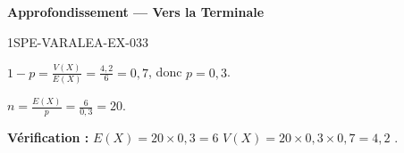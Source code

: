 \begin{center}\textbf{Approfondissement — Vers la Terminale}\end{center}
\begin{corrige}{1SPE-VARALEA-EX-033}


$1-p = \frac{V(X)}{E(X)} = \frac{4{,}2}{6} = 0{,}7$, donc $p = 0{,}3$.

$n = \frac{E(X)}{p} = \frac{6}{0{,}3} = 20$.

\textbf{Vérification :} $E(X) = 20 \times 0{,}3 = 6$ \checkmark \quad $V(X) = 20 \times 0{,}3 \times 0{,}7 = 4{,}2$ \checkmark.

\end{corrige}
